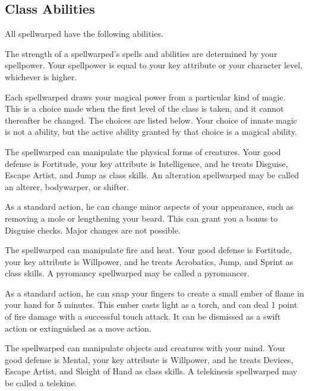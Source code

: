     \subsection{Class Abilities}
        All spellwarped have the following abilities.

        The strength of a spellwarped's spells and abilities are determined by your spellpower.
        Your spellpower is equal to your key attribute or your character level, whichever is higher.

        Each spellwarped draws your magical power from a particular kind of magic.
        This is a choice made when the first level of the class is taken, and it cannot thereafter be changed.
        The choices are listed below.
        Your choice of innate magic is not a  ability, but the active ability granted by that choice is a magical ability.

        The spellwarped can manipulate the physical forms of creatures.
        Your good defense is Fortitude, your key attribute is Intelligence, and he treats Disguise, Escape Artist, and Jump as class skills.
        An alteration spellwarped may be called an alterer, bodywarper, or shifter.

        As a standard action, he can change minor aspects of your appearance, such as removing a mole or lengthening your beard.
        This can grant you a  bonus to Disguise checks.
        Major changes are not possible.

        The spellwarped can manipulate fire and heat.
        Your good defense is Fortitude, your key attribute is Willpower, and he treats Acrobatics, Jump, and Sprint as class skills.
        A pyromancy spellwarped may be called a pyromancer.

        As a standard action, he can snap your fingers to create a small ember of flame in your hand for 5 minutes.
        This ember casts light as a torch, and can deal 1 point of fire damage with a successful touch attack.
        It can be dismissed as a swift action or extinguished as a move action.

        The spellwarped can manipulate objects and creatures with your mind.
        Your good defense is Mental, your key attribute is Willpower, and he treats Devices, Escape Artist, and Sleight of Hand as class skills.
        A telekinesis spellwarped may be called a telekine.

